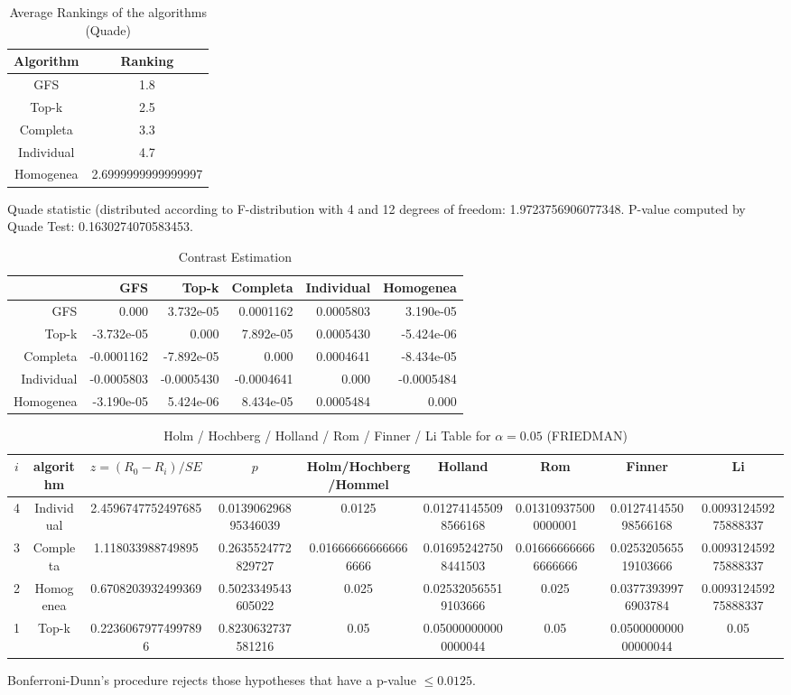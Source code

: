 \documentclass[a4paper,10pt]{article}
\begin{document}
\begin{landscape}
\newpage

\begin{table}[!htp]
\centering
\caption{Average Rankings of the algorithms (Quade)
}\begin{tabular}{c|c}
Algorithm&Ranking\\
\hline
GFS&1.8\\
Top-k&2.5\\
Completa&3.3\\
Individual&4.7\\
Homogenea&2.6999999999999997\\
\end{tabular}
\end{table}
Quade statistic (distributed according to F-distribution with 4 and 12 degrees of freedom: 1.9723756906077348. 
P-value computed by Quade Test: 0.1630274070583453.\newline


\newpage

\begin{table}[!htp]
\centering\tiny
\caption{Contrast Estimation}
\begin{tabular}{
|r|r|r|r|r|r|}
\hline
 &GFS&Top-k&Completa&Individual&Homogenea\\
\hline
GFS&0.000&3.732e-05&0.0001162&0.0005803&3.190e-05\\
\hline
Top-k&-3.732e-05&0.000&7.892e-05&0.0005430&-5.424e-06\\
\hline
Completa&-0.0001162&-7.892e-05&0.000&0.0004641&-8.434e-05\\
\hline
Individual&-0.0005803&-0.0005430&-0.0004641&0.000&-0.0005484\\
\hline
Homogenea&-3.190e-05&5.424e-06&8.434e-05&0.0005484&0.000\\
\hline

\end{tabular}
\end{table}

\newpage

\begin{table}[!htp]
\centering\scriptsize
\caption{Holm / Hochberg / Holland / Rom / Finner / Li Table for $\alpha=0.05$ (FRIEDMAN)}
\begin{tabular}{ccccccccc}
$i$&algorithm&$z=(R_0 - R_i)/SE$&$p$&Holm/Hochberg/Hommel&Holland&Rom&Finner&Li\\
\hline
4&Individual&2.4596747752497685&0.013906296895346039&0.0125&0.012741455098566168&0.013109375000000001&0.012741455098566168&0.009312459275888337\\
3&Completa&1.118033988749895&0.2635524772829727&0.016666666666666666&0.016952427508441503&0.016666666666666666&0.025320565519103666&0.009312459275888337\\
2&Homogenea&0.6708203932499369&0.5023349543605022&0.025&0.025320565519103666&0.025&0.03773939976903784&0.009312459275888337\\
1&Top-k&0.22360679774997896&0.8230632737581216&0.05&0.050000000000000044&0.05&0.050000000000000044&0.05\\
\hline
\end{tabular}
\end{table}
Bonferroni-Dunn's procedure rejects those hypotheses that have a p-value $\le0.0125$.



\end{landscape}
\end{document}
